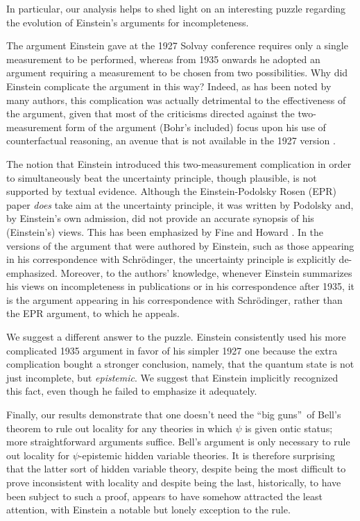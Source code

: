 \documentclass[aps,nofootinbib,12pt]{revtex4}
\begin{document}
In particular, our analysis helps to shed light on an interesting
puzzle regarding the evolution of Einstein's arguments for
incompleteness.


The argument Einstein gave at the 1927 Solvay conference requires
only a single measurement to be performed, whereas from 1935 onwards
he adopted an argument requiring a measurement to be chosen from two
possibilities. Why did Einstein complicate the argument in this way?
Indeed, as has been noted by many authors, this complication was
actually detrimental to the effectiveness of the argument, given
that most of the criticisms directed against the two-measurement
form of the argument (Bohr's included) focus upon his use of
counterfactual reasoning, an avenue that is not available in the
1927 version \cite{Hardy1995,Redhead,Fine,Maudlin,norsenboxes}.

The notion that Einstein introduced this two-measurement
complication in order to simultaneously beat the uncertainty
principle, though plausible, is not supported by textual evidence.
Although the Einstein-Podolsky Rosen (EPR) paper \emph{does} take
aim at the uncertainty principle, it was written by Podolsky and, by
Einstein's own admission, did not provide an accurate synopsis of
his (Einstein's) views. This has been emphasized by Fine
\cite{FineEcritique} and Howard \cite{Howard_einstnotepr}. In the
versions of the argument that were authored by Einstein, such as
those appearing in his correspondence with Schr\"{o}dinger, the
uncertainty principle is explicitly de-emphasized. Moreover, to the
authors' knowledge, whenever Einstein summarizes his views on
incompleteness in publications or in his correspondence after 1935,
it is the argument appearing in his correspondence with
Schr\"{o}dinger, rather than the EPR argument, to which he appeals.

We suggest a different answer to the puzzle. Einstein consistently
used his more complicated 1935 argument in favor of his simpler 1927
one because the extra complication bought a stronger conclusion,
namely, that the quantum state is not just incomplete, but
\textit{epistemic}. We suggest that Einstein implicitly recognized
this fact, even though he failed to emphasize it adequately.

Finally, our results demonstrate that one doesn't need the
\textquotedblleft big guns\textquotedblright\ of Bell's theorem
\cite{Bell_locality} to rule out locality for any theories in which
$\psi$ is given ontic status; more straightforward arguments
suffice. Bell's argument is only necessary to rule out locality for
$\psi$-epistemic hidden variable theories. It is therefore
surprising that the latter sort of hidden variable theory, despite
being the most difficult to prove inconsistent with locality and
despite being the last, historically, to have been subject to such a
proof, appears to have somehow attracted the least attention, with
Einstein a notable but lonely exception to the rule.
\end{document}
